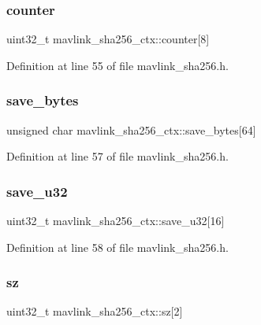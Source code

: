 \subsubsection{\texorpdfstring{counter}{counter}}
{\footnotesize\ttfamily uint32\+\_\+t mavlink\+\_\+sha256\+\_\+ctx\+::counter\mbox{[}8\mbox{]}}



Definition at line 55 of file mavlink\+\_\+sha256.\+h.

\mbox{\label{structmavlink__sha256__ctx_a27810458c04071b0bda70321220f98fa}} 
\subsubsection{\texorpdfstring{save\_bytes}{save\_bytes}}
{\footnotesize\ttfamily unsigned char mavlink\+\_\+sha256\+\_\+ctx\+::save\+\_\+bytes\mbox{[}64\mbox{]}}



Definition at line 57 of file mavlink\+\_\+sha256.\+h.

\mbox{\label{structmavlink__sha256__ctx_a60e965634bd711dde27d9803a71ba1b7}} 
\subsubsection{\texorpdfstring{save\_u32}{save\_u32}}
{\footnotesize\ttfamily uint32\+\_\+t mavlink\+\_\+sha256\+\_\+ctx\+::save\+\_\+u32\mbox{[}16\mbox{]}}



Definition at line 58 of file mavlink\+\_\+sha256.\+h.

\mbox{\label{structmavlink__sha256__ctx_a03ee3df8ed24380ea86030ffbe9a489b}} 
\subsubsection{\texorpdfstring{sz}{sz}}
{\footnotesize\ttfamily uint32\+\_\+t mavlink\+\_\+sha256\+\_\+ctx\+::sz\mbox{[}2\mbox{]}}



